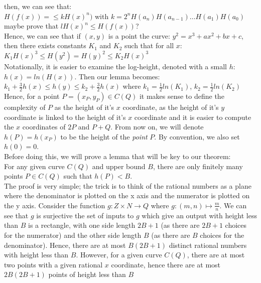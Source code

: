 \documentclass{article}
\begin{document}
then, we can see that:\\

$H(f(x)) = \leq k H(x)^n)$ with $k= 2^n H(a_n)H(a_{n-1})\dots H(a_1)H(a_0)$\\

maybe prove that $l H(x)^n \leq H(f(x))$?\\

Hence, we can see that if $(x, y)$ is a point the curve: $y^2 = x^3 + ax^2 + bx + c$, then there exists constants $K_1$ and $K_2$ such that for all $x$:\\

$K_1 H(x)^3 \leq H(y^2) = H(y)^2 \leq K_2 H(x)^3$\\

Notationally, it is easier to examine the log-height, denoted with a small $h$: $h(x) = ln(H(x))$. Then our lemma becomes: \\

$k_1 + \frac{3}{2} h(x) \leq h(y) \leq k_2 + \frac{3}{2} h(x)$ \quad where \quad $k_1 = \frac{1}{2}ln(K_1)$, $k_2 = \frac{1}{2}ln(K_2)$\\

Hence, for a point $P = (x_P, y_P) \in C(Q)$ it makes sense to define the complexity of $P$ as the height of it's $x$ coordinate, as the height of it's $y$ coordinate is linked to the height of it's $x$ coordinate and it is easier to compute the $x$ coordinates of $2P$ and $P + Q$. From now on, we will denote $h(P) = h(x_P)$ to be the height of the \emph{point} $P$. By convention, we also set $h(0) = 0$.\\

Before doing this, we will prove a lemma that will be key to our theorem:\\

For any given curve $C(Q)$ and upper bound $B$, there are only finitely many points $P \in C(Q)$ such that $h(P) < B$.\\

The proof is very simple; the trick is to think of the rational numbers as a plane where the denominator is plotted on the x axis and the numerator is plotted on the y axis. Consider the function $g: Z \times N \rightarrow Q$ where $g: (m, n) \mapsto \frac{m}{n}$. We can see that $g$ is surjective the set of inputs to $g$ which give an output with height less than $B$ is a rectangle, with one side length $2B + 1$ (as there are $2B + 1$ choices for the numerator) and the other side length $B$ (as there are $B$ choices for the denominator). Hence, there are at most $B(2B + 1)$ distinct rational numbers with height less than $B$. However, for a given curve $C(Q)$, there are at most two points with a given rational $x$ coordinate, hence there are at most $2B(2B + 1)$ points of height less than $B$\\
\end{document}

